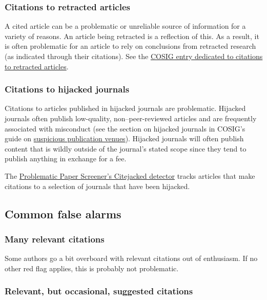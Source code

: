 \documentclass[letterpaper, 12pt]{article}
\begin{document}
\subsubsection*{Citations to retracted articles}

A cited article can be a problematic or unreliable source of information for a variety of reasons. An article being retracted is a reflection of this. As a result, it is often problematic for an article to rely on conclusions from retracted research (as indicated through their citations). See the \href{https://osf.io/9q3as}{COSIG entry dedicated to citations to retracted articles}.

\subsubsection*{Citations to hijacked journals}

Citations to articles published in hijacked journals are problematic. Hijacked journals often publish low-quality, non–peer-reviewed articles and are frequently associated with  misconduct (see the section on hijacked journals in COSIG's guide on \href{https://osf.io/vrk7e}{suspicious publication venues}). Hijacked journals will often publish content that is wildly outside of the journal's stated scope since they tend to publish anything in exchange for a fee.

The \href{https://www.irit.fr/~Guillaume.Cabanac/problematic-paper-screener/citejacked}{Problematic Paper Screener's Citejacked detector} tracks articles that make citations to a selection of journals that have been hijacked.

\subsection*{Common false alarms}

\subsubsection*{Many relevant citations}

Some authors go a bit overboard with
relevant citations out of enthusiasm. If no other red flag applies,
this is probably not problematic.

\subsubsection*{Relevant, but occasional, suggested citations}
\end{document}
